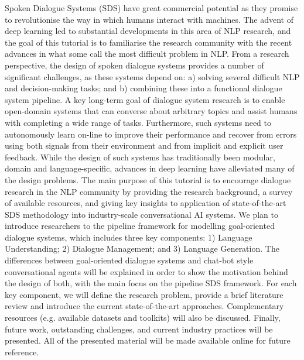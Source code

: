 Spoken Dialogue Systems (SDS) have great commercial potential as they promise to revolutionise the way in which humans interact with machines. The advent of deep learning led to substantial developments in this area of NLP research, and the goal of this tutorial is to familiarise the research community with the recent advances in what some call the most difficult problem in NLP. From a research perspective, the design of spoken dialogue systems provides a number of significant challenges, as these systems depend on: a) solving several difficult NLP and decision-making tasks; and b) combining these into a functional dialogue system pipeline. A key long-term goal of dialogue system research is to enable open-domain  systems that can converse about arbitrary topics and assist humans with completing a wide range of tasks. Furthermore, such systems need to autonomously learn on-line to improve their performance and recover from errors using both signals from their environment and from implicit and explicit user feedback. While the design of such systems has traditionally been modular, domain and language-specific, advances in deep learning have alleviated many of the design problems. The main purpose of this tutorial is to encourage dialogue research in the NLP community by providing the research background, a survey of available resources, and giving key insights to application of state-of-the-art SDS methodology into industry-scale conversational AI systems. We plan to introduce researchers to the pipeline framework for modelling goal-oriented dialogue systems, which includes three key components: 1) Language Understanding; 2) Dialogue Management; and 3) Language Generation. The differences between goal-oriented dialogue systems and chat-bot style conversational agents will be explained in order to show the motivation behind the design of both, with the main focus on the pipeline SDS framework. For each key component, we will define the research problem, provide a brief literature review and introduce the current state-of-the-art approaches. Complementary resources (e.g. available datasets and toolkits) will also be discussed. Finally, future work, outstanding challenges, and current industry practices will be presented. All of the presented material will be made available online for future reference.
